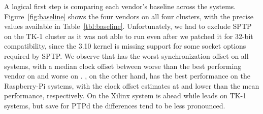 





A logical first step is comparing each vendor's baseline across the systems. Figure~\ref{fig:baseline} shows the four vendors on all four clusters, with the precise values available in Table~\ref{tbl:baseline}. Unfortunately, we had to exclude SPTP on the TK-1 cluster as it was not able to run even after we patched it for 32-bit compatibility, since the 3.10 kernel is missing support for some socket options required by SPTP. We observe that  has the worst synchronization offset on all systems, with a median clock offset between  worse than the best performing vendor on  and  worse on .
, on the other hand, has the best performance on the Raspberry-Pi systems, with the clock offset estimates at  and  lower than the mean performance, respectively. On the Xilinx system  is ahead while  leads on TK-1 systems, but save for PTPd the differences tend to be less pronounced.


